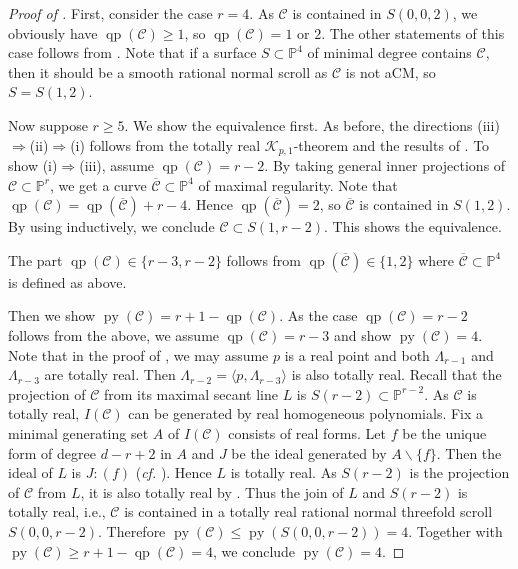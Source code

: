 \documentclass[11pt,letterpaper,reqno]{amsart}
\theoremstyle{plain}
\theoremstyle{definition}
\newtheorem{open problem}[theorem]{Open Problem}
\newtheorem{remark and notation}[theorem]{Remark and Notation}
\newtheorem{remark and definition}[theorem]{Remark and Definition}
\newtheorem{definition and notation}[theorem]{Definition and Notation}
\newtheorem{notation and convention}[theorem]{Notation and Convention}
\newtheorem{notation and remark}[theorem]{Notation and Remark}
\newtheorem{convention and notation}[theorem]{Convention and Notation}
\def \p {\mathbb{P}}
\def \py {\operatorname{py}}
\def \qp {\operatorname{qp}}
\begin{document}
\begin{proof}[Proof of ]
    First, consider the case $r=4$.
    As $\mathcal{C}$ is contained in $S(0,0,2)$, we obviously have $\qp(\mathcal{C})\geq 1$, so $\qp(\mathcal{C})=1$ or $2$.
    The other statements of this case follows from .
    Note that if a surface $S\subset\p^4$ of minimal degree contains $\mathcal{C}$, then it should be a smooth rational normal scroll as $\mathcal{C}$ is not aCM, so $S=S(1,2)$.
    
    Now suppose $r\geq 5$.
    We show the equivalence first.
    As before, the directions (iii)$\Rightarrow$(ii)$\Rightarrow$(i) follows from the totally real $\mathcal{K}_{p,1}$-theorem and the results of \cite{MR4397034}.
    To show (i)$\Rightarrow$(iii), assume $\qp(\mathcal{C})=r-2$.
    By taking general inner projections of $\mathcal{C}\subset\p^r$, we get a curve $\overline{\mathcal{C}}\subset\p^4$ of maximal regularity. Note that $\qp(\mathcal{C})=\qp(\overline{\mathcal{C}})+r-4$.
    Hence $\qp(\overline{\mathcal{C}})=2$, so $\overline{\mathcal{C}}$ is contained in $S(1,2)$. By using  inductively, we conclude $\mathcal{C}\subset S(1,r-2)$. This shows the equivalence.
    
    The part $\qp(\mathcal{C})\in\{r-3,r-2\}$ follows from $\qp(\overline{\mathcal{C}})\in\{1,2\}$ where $\overline{\mathcal{C}}\subset\p^4$ is defined as above.
    
    Then we show $\py(\mathcal{C})=r+1-\qp(\mathcal{C})$.
    As the case $\qp(\mathcal{C})=r-2$ follows from the above, we assume $\qp(\mathcal{C})=r-3$ and show $\py(\mathcal{C})=4$.
    Note that in the proof of , we may assume $p$ is a real point and both $\Lambda_{r-1}$ and $\Lambda_{r-3}$ are totally real. Then $\Lambda_{r-2}=\langle p,\Lambda_{r-3}\rangle$ is also totally real.
    Recall that the projection of $\mathcal{C}$ from its maximal secant line $L$ is $S(r-2)\subset\p^{r-2}$.
    As $\mathcal{C}$ is totally real, $I(\mathcal{C})$ can be generated by real homogeneous polynomials. Fix a minimal generating set $A$ of $I(\mathcal{C})$ consists of real forms. 
    Let $f$ be the unique form of degree $d-r+2$ in $A$ and $J$ be the ideal generated by $A\backslash \{f\}$.
    Then the ideal of $L$ is $J:(f)$ (\textit{cf.} \cite{MR1992539}).
    Hence $L$ is totally real. As $S(r-2)$ is the projection of $\mathcal{C}$ from $L$, it is also totally real by . Thus the join of $L$ and $S(r-2)$ is totally real, i.e., $\mathcal{C}$ is contained in a totally real rational normal threefold scroll $S(0,0,r-2)$. Therefore $\py(\mathcal{C})\leq \py(S(0,0,r-2))=4$. Together with $\py(\mathcal{C})\geq r+1-\qp(\mathcal{C})=4$, we conclude $\py(\mathcal{C})=4$.
\end{proof}
\end{document}
